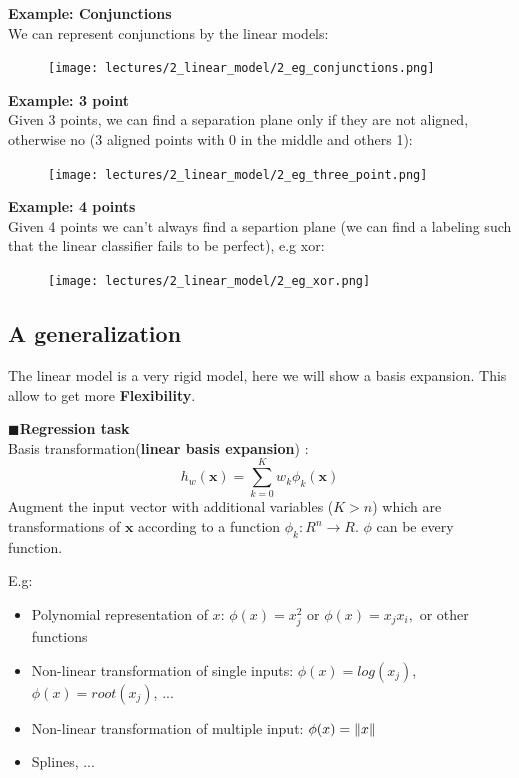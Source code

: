 \documentclass[../main.tex]{subfiles}
\begin{document}
\textbf{Example: Conjunctions}\\
We can represent conjunctions by the linear models:
\begin{figure}[H]
    \centering
    \texttt{[image: lectures/2\_linear\_model/2\_eg\_conjunctions.png]}
\end{figure}

\textbf{Example: 3 point}\\
Given 3 points, we can find a separation plane only if they are not aligned, otherwise no (3 aligned points with 0 in the middle and others 1):

\begin{figure}[H]
    \centering
    \texttt{[image: lectures/2\_linear\_model/2\_eg\_three\_point.png]}
\end{figure}

\textbf{Example: 4 points}\\
Given 4 points we can't always find a separtion plane (we can find a labeling such that the linear classifier fails to be perfect), e.g xor:
\begin{figure}[H]
    \centering
    \texttt{[image: lectures/2\_linear\_model/2\_eg\_xor.png]}
\end{figure}


\subsection{A generalization}
The linear model is a very rigid model, here we will show a basis expansion. This allow to get more \textbf{Flexibility}.

\noindent$\blacksquare$\textbf{Regression task}\\
Basis transformation(\textbf{linear basis expansion}) :
$$h_w(\mathbf{x})=\sum_{k = 0}^{K} w_k\phi_k(\mathbf{x})$$
Augment the input vector with additional variables ($K>n$) which are transformations of $\mathbf{x}$ according to a function $\phi_k: R^n\rightarrow R$. $\phi$ can be every function.

E.g:
\begin{itemize}
    \item Polynomial representation of $x$: $\phi(x) = x_j^2$ or $\phi(x) = x_jx_i,$ or other functions
    \item Non-linear transformation of single inputs: $\phi(x) = log(x_j)$, $\phi(x) = root(x_j)$, ...
    \item Non-linear transformation of multiple input: $\phi(x) = \left\lVert x\right\rVert$
    \item Splines, ...
\end{itemize}
\end{document}
